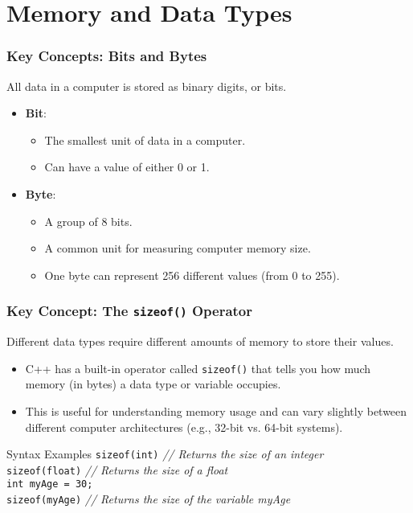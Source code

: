 \documentclass{beamer}
\begin{document}
\section{Memory and Data Types}

\begin{frame}
\frametitle{Key Concepts: Bits and Bytes}
All data in a computer is stored as binary digits, or bits.

\begin{itemize}
    \item \textbf{Bit}:
    \begin{itemize}
        \item The smallest unit of data in a computer.
        \item Can have a value of either \alert{0} or \alert{1}.
    \end{itemize}
    \pause
    \item \textbf{Byte}:
    \begin{itemize}
        \item A group of \alert{8 bits}.
        \item A common unit for measuring computer memory size.
        \item One byte can represent 256 different values (from 0 to 255).
    \end{itemize}
\end{itemize}
\end{frame}

\begin{frame}
\frametitle{Key Concept: The \texttt{sizeof()} Operator}
Different data types require different amounts of memory to store their values.

\begin{itemize}
    \item C++ has a built-in operator called \texttt{sizeof()} that tells you how much memory (in bytes) a data type or variable occupies.
    \item This is useful for understanding memory usage and can vary slightly between different computer architectures (e.g., 32-bit vs. 64-bit systems).
\end{itemize}
\pause
\begin{block}{Syntax Examples}
\texttt{sizeof(int)} \hfill \textit{// Returns the size of an integer} \\
\texttt{sizeof(float)} \hfill \textit{// Returns the size of a float} \\
\texttt{int myAge = 30;} \\
\texttt{sizeof(myAge)} \hfill \textit{// Returns the size of the variable myAge}
\end{block}
\end{frame}
\end{document}
